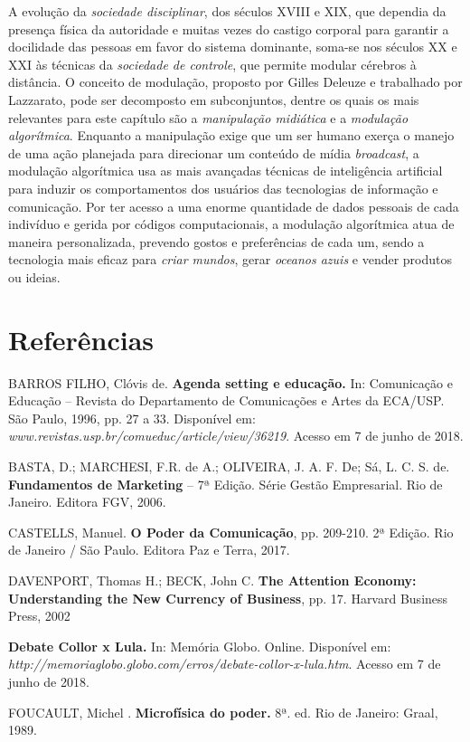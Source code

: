 A evolução da \emph{sociedade disciplinar}, dos séculos XVIII e XIX, que
dependia da presença física da autoridade e muitas vezes do castigo
corporal para garantir a docilidade das pessoas em favor do sistema
dominante, soma-se nos séculos XX e XXI às técnicas da \emph{sociedade
de controle}, que permite modular cérebros à distância. O conceito de
modulação, proposto por Gilles Deleuze e trabalhado por Lazzarato, pode
ser decomposto em subconjuntos, dentre os quais os mais relevantes para
este capítulo são a \emph{manipulação midiática} e a \emph{modulação
algorítmica}. Enquanto a manipulação exige que um ser humano exerça o
manejo de uma ação planejada para direcionar um conteúdo de mídia
\emph{broadcast}, a modulação algorítmica usa as mais avançadas técnicas
de inteligência artificial para induzir os comportamentos dos usuários
das tecnologias de informação e comunicação. Por ter acesso a uma enorme
quantidade de dados pessoais de cada indivíduo e gerida por códigos
computacionais, a modulação algorítmica atua de maneira personalizada,
prevendo gostos e preferências de cada um, sendo a tecnologia mais
eficaz para \emph{criar mundos}, gerar \emph{oceanos azuis} e vender
produtos ou ideias.

\section{Referências}

BARROS FILHO, Clóvis de. \textbf{Agenda setting e educação.} In:
Comunicação e Educação -- Revista do Departamento de Comunicações e
Artes da ECA/USP. São Paulo, 1996, pp. 27 a 33. Disponível em:
\emph{www.revistas.usp.br/comueduc/article/view/36219}. Acesso em 7 de junho de 2018.

BASTA, D.; MARCHESI, F.R. de A.; OLIVEIRA, J. A. F. De; Sá, L. C. S. de.
\textbf{Fundamentos de Marketing} -- 7ª Edição. Série Gestão
Empresarial. Rio de Janeiro. Editora FGV, 2006.

CASTELLS, Manuel. \textbf{O Poder da Comunicação}, pp. 209-210. 2ª
Edição. Rio de Janeiro / São Paulo. Editora Paz e Terra, 2017.

DAVENPORT, Thomas H.; BECK, John C. \textbf{The Attention Economy:
Understanding the New Currency of Business}, pp. 17. Harvard Business
Press, 2002

\textbf{Debate Collor x Lula.} In: Memória Globo. Online. Disponível em:
\emph{http://memoriaglobo.globo.com/erros/debate-collor-x-lula.htm}.
Acesso em 7 de junho de 2018.

FOUCAULT, Michel . \textbf{Microfísica do poder.} 8ª. ed. Rio de
Janeiro: Graal, 1989.

